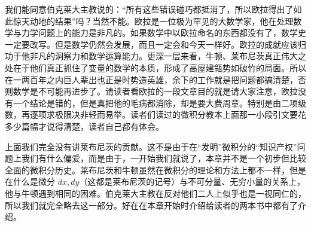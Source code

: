 我们能同意伯克莱大主教说的：“所有这些错误碰巧都抵消了，所以欧拉得出了如此惊天动地的结果”吗？当然不能。欧拉是一位极为罕见的大数学家，他在处理数学与力学问题上的能力是非凡的。如果数学中以欧拉命名的东西都没有了，数学史一定要改写。但是数学仍然会发展，而且一定会和今天一样好。欧拉的成就应该归功于他非凡的洞察力和数学运算能力。更深一层来看，牛顿、莱布尼茨真正伟大之处在于他们真正抓住了变量的数学的本质，形成了高屋建瓴势如破竹的局面。所以在一两百年之内巨人辈出也正是时势造英雄，余下的工作就是把问题都搞清楚，否则数学是不可能再进步了。请读者看欧拉的一段文章目的就是请大家注意，欧拉没有一个结论是错的，但是真把他的毛病都消除，却是要大费周章。特别是由二项级数，再逐项求极限决非轻而易举。读者们读过的微积分教本上面那一小段引文要花多少篇幅才说得清楚，读者自己都有体会。

上面我们完全没有讲莱布尼茨的贡献。这不是由于在“发明”微积分的“知识产权”问题上我们有什么偏爱，而是由于，一开始我们就说了，本章并不是一个初步但比较全面的微积分历史。莱布尼茨和牛顿虽然在微积分的理论和方法上都不一样，但是在什么是微分 $dx,dy$（这都是莱布尼茨的记号）与不可分量、无穷小量的关系上，他与牛顿遇到相同的困难。伯克莱大主教在反对他们二人上似乎也是一视同仁的，所以我们就完全略去这一部分。好在在本章开始时介绍给读者的两本书中都有了介绍。

